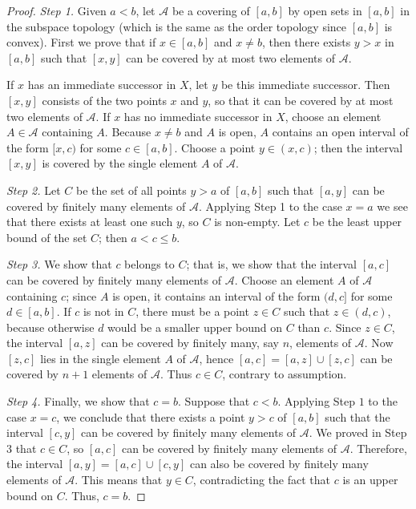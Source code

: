 \begin{proof}
    \emph{Step 1.} Given $a < b$, let $\mathcal{A}$ be a covering of $[a,b]$ by open sets in $[a,b]$ in the subspace topology (which is the same as the order topology since $[a,b]$ is convex). First we prove that if $x \in [a,b]$ and $x \neq b$, then there exists $y > x$ in $[a,b]$ such that $[x,y]$ can be covered by at most two elements of $\mathcal{A}$.

    If $x$ has an immediate successor in $X$, let $y$ be this immediate successor. Then $[x,y]$ consists of the two points $x$ and $y$, so that it can be covered by at most two elements of $\mathcal{A}$. If $x$ has no immediate successor in $X$, choose an element $A \in \mathcal{A}$ containing $A$. Because $x \neq b$ and $A$ is open, $A$ contains an open interval of the form $[x,c)$ for some $c \in [a,b]$. Choose a point $y \in (x,c)$; then the interval $[x,y]$ is covered by the single element $A$ of $\mathcal{A}$.

    \emph{Step 2.} Let $C$ be the set of all points $y > a$ of $[a,b]$ such that $[a,y]$ can be covered by finitely many elements of $\mathcal{A}$. Applying Step 1 to the case $x = a$ we see that there exists at least one such $y$, so $C$ is non-empty. Let $c$ be the least upper bound of the set $C$; then $a < c \leq b$.

    \emph{Step 3.} We show that $c$ belongs to $C$; that is, we show that the interval $[a,c]$ can be covered by finitely many elements of $\mathcal{A}$. Choose an element $A$ of $\mathcal{A}$ containing $c$; since $A$ is open, it contains an interval of the form $(d,c]$ for some $d \in [a,b]$. If $c$ is not in $C$, there must be a point $z \in C$ such that $z \in (d,c)$, because otherwise $d$ would be a smaller upper bound on $C$ than $c$. Since $z \in C$, the interval $[a,z]$ can be covered by finitely many, say $n$, elements of $\mathcal{A}$. Now $[z,c]$ lies in the single element $A$ of $\mathcal{A}$, hence $[a,c] = [a,z]\cup[z,c]$ can be covered by $n+1$ elements of $\mathcal{A}$. Thus $c \in C$, contrary to assumption.

    \emph{Step 4.} Finally, we show that $c = b$. Suppose that $c < b$. Applying Step $1$ to the case $x = c$, we conclude that there exists a point $y > c$ of $[a,b]$ such that the interval $[c,y]$ can be covered by finitely many elements of $\mathcal{A}$. We proved in Step 3 that $c \in C$, so $[a,c]$ can be covered by finitely many elements of $\mathcal{A}$. Therefore, the interval $[a,y] = [a,c] \cup [c,y]$ can also be covered by finitely many elements of $\mathcal{A}$. This means that $y \in C$, contradicting the fact that $c$ is an upper bound on $C$. Thus, $c = b$.
\end{proof}

